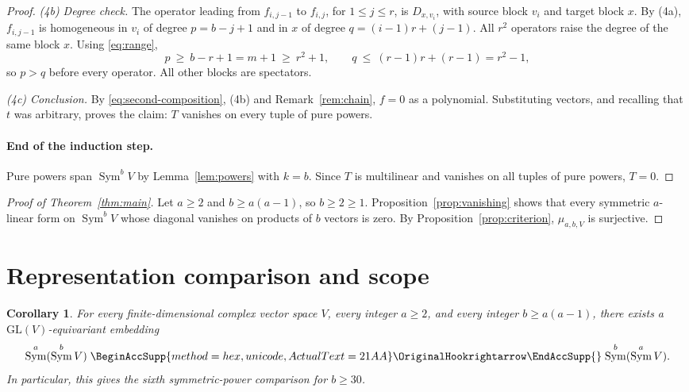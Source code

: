 \documentclass[11pt]{article}
\renewcommand{\hookrightarrow}{\mathrel{
  \BeginAccSupp{method=hex,unicode,ActualText=21AA}
  \OriginalHookrightarrow\EndAccSupp{}}}
\newtheorem{corollary}[theorem]{Corollary}
\theoremstyle{remark}
\DeclareMathOperator{\Sym}{Sym}
\newcommand{\D}[2]{D_{#1,#2}}
\begin{document}
\begin{proof}
\emph{(4b) Degree check.}
The operator leading from $f_{i,j-1}$ to $f_{i,j}$, for $1\le j\le r$, is
$\D{x}{v_i}$, with source block $v_i$ and target block $x$. By (4a),
$f_{i,j-1}$ is homogeneous in $v_i$ of degree $p=b-j+1$ and in $x$ of
degree $q=(i-1)r+(j-1)$. All $r^2$ operators raise the degree of the same
block $x$. Using \eqref{eq:range},
\[
 p\ \ge\ b-r+1=m+1\ \ge\ r^2+1,\qquad
 q\ \le\ (r-1)r+(r-1)=r^2-1,
\]
so $p>q$ before every operator. All other blocks are spectators.

\emph{(4c) Conclusion.}
By \eqref{eq:second-composition}, (4b) and Remark~\ref{rem:chain}, $f=0$
as a polynomial. Substituting vectors, and recalling that $t$ was
arbitrary, proves the claim: $T$ vanishes on every tuple of pure powers.

\paragraph{End of the induction step.}
Pure powers span $\Sym^bV$ by Lemma~\ref{lem:powers} with $k=b$. Since $T$
is multilinear and vanishes on all tuples of pure powers, $T=0$.
\end{proof}

\begin{proof}[Proof of Theorem~\ref{thm:main}]
Let $a\ge2$ and $b\ge a(a-1)$, so $b\ge2\ge1$.
Proposition~\ref{prop:vanishing} shows that every symmetric $a$-linear form
on $\Sym^bV$ whose diagonal vanishes on products of $b$ vectors is zero. By
Proposition~\ref{prop:criterion}, $\mu_{a,b,V}$ is surjective.
\end{proof}

\section{Representation comparison and scope}\label{sec:comparison}

\begin{corollary}\label{cor:comparison}
For every finite-dimensional complex vector space $V$, every integer
$a\ge2$, and every integer $b\ge a(a-1)$, there exists a
$\mathrm{GL}(V)$-equivariant embedding
\[
 \Sym^a(\Sym^b V)\hookrightarrow\Sym^b(\Sym^a V).
\]
In particular, this gives the sixth symmetric-power comparison for $b\ge30$.
\end{corollary}
\end{document}
